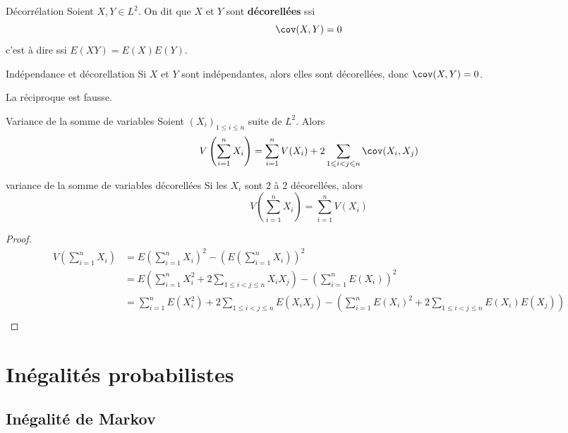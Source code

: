 \begin{definition}{Décorrélation}{}
    Soient $X, Y \in L^2$. On dit que $X$ et $Y$ sont \textbf{décorellées} ssi 
    $$ \cov(X, Y) = 0 $$
    c'est à dire ssi $E(XY) = E(X) E(Y)$.
\end{definition}

\begin{proposition}{Indépendance et décorellation}{}
    Si $X$ et $Y$ sont indépendantes, alors elles sont décorellées, donc $\cov(X, Y) = 0$.
\end{proposition}

\begin{remarque}
    La réciproque est fausse. 
\end{remarque}

\begin{theoreme}{Variance de la somme de variables}{}
    Soient $(X_i)_{1 \leqslant i \leqslant n}$ suite de $L^2$. Alors 
    $$ V\left( \sum_{i = 1}^n X_i \right) = \sum_{i = 1}^n V(X_i) + 2 \sum_{1 \leqslant i < j \leqslant n} \cov(X_i, X_j) $$
\end{theoreme}

\begin{corollaire}{variance de la somme de variables décorellées}{}
    Si les $X_i$ sont 2 à 2 décorellées, alors
    $$ V\left( \sum_{i = 1}^n X_i \right) = \sum_{i = 1}^n V(X_i) $$
\end{corollaire}

\begin{proof}
    \begin{align}
        V \left( \sum_{i = 1}^n X_i \right) & = E \left( \sum_{i = 1}^n X_i \right)^2 - \left( E \left( \sum_{i = 1}^n X_i \right) \right)^2 \\
        & = E \left( \sum_{i = 1}^n X_i^2 + 2 \sum_{1 \leqslant i < j \leqslant n} X_i X_j \right) - \left( \sum_{i = 1}^n E(X_i) \right)^2 \\
        & = \sum_{i = 1}^n E(X_i^2) + 2 \sum_{1 \leqslant i < j \leqslant n} E(X_i X_j) - \left( \sum_{i = 1}^n E(X_i)^2 + 2 \sum_{1 \leqslant i < j \leqslant n} E(X_i) E(X_j) \right) \\
    \end{align}
\end{proof}

\section{Inégalités probabilistes }
\subsection{Inégalité de Markov}

